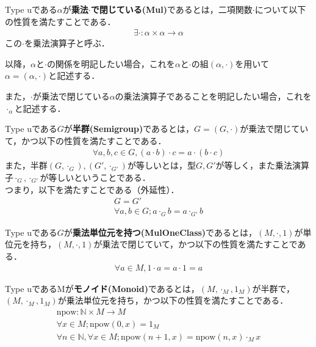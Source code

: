 \begin{definition}
    Type uである$\alpha$が\textbf{乗法$\cdot$で閉じている(Mul)}であるとは，二項関数$\cdot$について以下の性質を満たすことである．
    \begin{align}
        \exists \cdot : \alpha \times \alpha \rightarrow \alpha
    \end{align}
    この$\cdot$を乗法演算子と呼ぶ．

    以降，$\alpha$と$\cdot$の関係を明記したい場合，これを$\alpha$と$\cdot$の組$(\alpha,\cdot)$を用いて$\alpha = (\alpha,\cdot)$と記述する．

    また，$\cdot$が乗法で閉じている$\alpha$の乗法演算子であることを明記したい場合，これを$\cdot_\alpha$と記述する．
\end{definition}

\begin{definition}
    Type uである$G$が\textbf{半群(Semigroup)}であるとは，$G=(G,\cdot)$が乗法で閉じていて，かつ以下の性質を満たすことである．
    \begin{align}
        \forall a,b,c \in G,(a\cdot b)\cdot c = a\cdot(b\cdot c)
    \end{align}
    また，半群$(G,\cdot_G),(G',\cdot_{G'})$が等しいとは，型$G,G'$が等しく，また乗法演算子$\cdot_G,\cdot_{G'}$が等しいということである．\\
    つまり，以下を満たすことである（外延性）．
    \begin{align}
        G = G' \\
        \forall a,b \in G;a \cdot_G b = a \cdot_{G'}b
    \end{align}
\end{definition}


\begin{definition}
    Type uである$G$が\textbf{乗法単位元を持つ(MulOneClass)}であるとは，$(M,\cdot,1)$が単位元を持ち，$(M,\cdot,1)$が乗法で閉じていて，かつ以下の性質を満たすことである．
    \begin{align}
        \forall a \in M,1\cdot a = a\cdot 1 = a
    \end{align}
\end{definition}

\begin{definition}
    Type uであるMが\textbf{モノイド(Monoid)}であるとは，$(M,\cdot_M,1_M)$が半群で，$(M,\cdot_M,1_M)$が乗法単位元を持ち，かつ以下の性質を満たすことである．
    \begin{align}
        \text{npow} : \mathbb{N} \times M \rightarrow M\\
        \forall x \in M ; \text{npow} (0,x) = 1_M\\
        \forall n \in \mathbb{N},\forall x \in M ; \text{npow} (n+1,x)=\text{npow} (n,x)\cdot_M x
    \end{align}
\end{definition}

